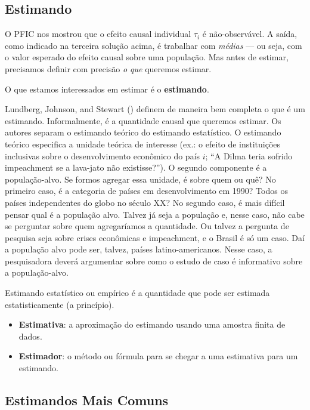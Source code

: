 \documentclass[
]{article}
\providecommand{\tightlist}{%
  \setlength{\itemsep}{0pt}\setlength{\parskip}{0pt}}
\begin{document}
\subsection{Estimando}\label{estimando}

O PFIC nos mostrou que o efeito causal individual \(\tau_i\) é não-observável. A saída, como indicado na terceira solução acima, é trabalhar com \emph{médias} --- ou seja, com o valor esperado do efeito causal sobre uma população. Mas antes de estimar, precisamos definir com precisão \emph{o que} queremos estimar.

O que estamos interessados em estimar é o \textbf{estimando}.

Lundberg, Johnson, and Stewart () definem de maneira bem completa o que é um estimando. Informalmente, é a quantidade causal que queremos estimar. Os autores separam o estimando teórico do estimando estatístico. O estimando teórico especifica a unidade teórica de interesse (ex.: o efeito de instituições inclusivas sobre o desenvolvimento econômico do país \(i\); ``A Dilma teria sofrido impeachment se a lava-jato não existisse?''). O segundo componente é a população-alvo. Se formos agregar essa unidade, é sobre quem ou quê? No primeiro caso, é a categoria de países em desenvolvimento em 1990? Todos os países independentes do globo no século XX? No segundo caso, é mais difícil pensar qual é a população alvo. Talvez já seja a população e, nesse caso, não cabe se perguntar sobre quem agregaríamos a quantidade. Ou talvez a pergunta de pesquisa seja sobre crises econômicas e impeachment, e o Brasil é só um caso. Daí a população alvo pode ser, talvez, países latino-americanos. Nesse caso, a pesquisadora deverá argumentar sobre como o estudo de caso é informativo sobre a população-alvo.

Estimando estatístico ou empírico é a quantidade que pode ser estimada estatisticamente (a princípio).

\begin{itemize}
\tightlist
\item
  \textbf{Estimativa}: a aproximação do estimando usando uma amostra finita de dados.
\item
  \textbf{Estimador}: o método ou fórmula para se chegar a uma estimativa para um estimando.
\end{itemize}

\subsection{Estimandos Mais Comuns}\label{estimandos-mais-comuns}
\end{document}
